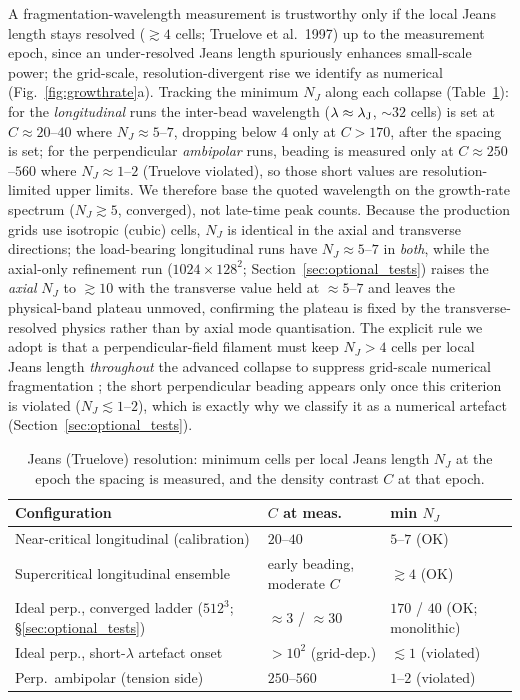 \documentclass[usenatbib,twoside,twocolumn]{mnras}
\begin{document}
A fragmentation-wavelength measurement is trustworthy only if the local Jeans length stays resolved ($\gtrsim4$ cells; Truelove et al.\ 1997) up to the measurement epoch, since an under-resolved Jeans length spuriously enhances small-scale power; the grid-scale, resolution-divergent rise we identify as numerical (Fig.~\ref{fig:growthrate}a). Tracking the minimum $N_J$ along each collapse (Table~\ref{tab:truelove}): for the \emph{longitudinal} runs the inter-bead wavelength ($\lambda\approx\lambda_{\rm J}$, $\sim32$ cells) is set at $C\approx20$--$40$ where $N_J\approx5$--$7$, dropping below 4 only at $C>170$, after the spacing is set; for the perpendicular \emph{ambipolar} runs, beading is measured only at $C\approx250$--$560$ where $N_J\approx1$--$2$ (Truelove violated), so those short values are resolution-limited upper limits. We therefore base the quoted wavelength on the growth-rate spectrum ($N_J\gtrsim5$, converged), not late-time peak counts. Because the production grids use isotropic (cubic) cells, $N_J$ is identical in the axial and transverse directions; the load-bearing longitudinal runs have $N_J\approx5$--$7$ in \emph{both}, while the axial-only refinement run ($1024\times128^2$; Section~\ref{sec:optional_tests}) raises the \emph{axial} $N_J$ to $\gtrsim10$ with the transverse value held at $\approx5$--$7$ and leaves the physical-band plateau unmoved, confirming the plateau is fixed by the transverse-resolved physics rather than by axial mode quantisation. The explicit rule we adopt is that a perpendicular-field filament must keep $N_J>4$ cells per local Jeans length \emph{throughout} the advanced collapse to suppress grid-scale numerical fragmentation \citep{Truelove1997}; the short perpendicular beading appears only once this criterion is violated ($N_J\lesssim1$--$2$), which is exactly why we classify it as a numerical artefact (Section~\ref{sec:optional_tests}).

\begin{table}
\caption{Jeans (Truelove) resolution: minimum cells per local Jeans length $N_J$ at the epoch the spacing is measured, and the density contrast $C$ at that epoch.}
\label{tab:truelove}
\footnotesize
\setlength{\tabcolsep}{3pt}
\begin{tabular}{@{}p{3.0cm}p{1.9cm}p{2.5cm}@{}}
\toprule
Configuration & $C$ at meas. & min $N_J$ \\
\midrule
Near-critical longitudinal (calibration) & $20$--$40$ & $5$--$7$ (OK) \\
Supercritical longitudinal ensemble & early beading, moderate $C$ & $\gtrsim4$ (OK) \\
Ideal perp., converged ladder ($512^3$; \S\ref{sec:optional_tests}) & $\approx3$ / $\approx30$ & $170$ / $40$ (OK; monolithic) \\
Ideal perp., short-$\lambda$ artefact onset & $>10^2$ (grid-dep.) & $\lesssim1$ (violated) \\
Perp.\ ambipolar (tension side) & $250$--$560$ & $1$--$2$ (violated) \\
\bottomrule
\end{tabular}
\end{table}
\end{document}
